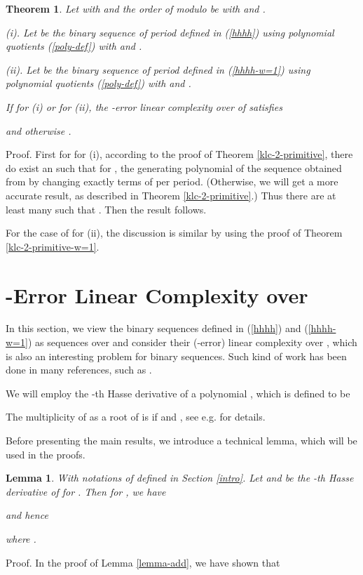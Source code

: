 \documentclass [11pt,a4paper]{article}
\newtheorem{theorem}{Theorem}
\newtheorem{lemma}{Lemma}
\begin{document}
\begin{theorem}\label{klc-2-general}
Let  with  and the order of  modulo  be  with  and .

(i). Let  be the binary sequence of period  defined in (\ref{hhhh}) using polynomial quotients (\ref{poly-def}) with  and .

(ii). Let  be the binary sequence of period  defined in (\ref{hhhh-w=1})  using polynomial quotients (\ref{poly-def}) with   and .

If  for (i) or  for (ii), the -error linear complexity over  of   satisfies

 and otherwise .
\end{theorem}
Proof. First for  for (i), according to the proof of Theorem \ref{klc-2-primitive}, there do exist an  such that
  for , the generating polynomial of the sequence obtained from  by changing exactly  terms of  per period. (Otherwise, we will get a more accurate result, as described in Theorem \ref{klc-2-primitive}.)
Thus there are at least  many  such that . Then the result follows.

For the case of   for (ii), the discussion is similar by using  the proof of Theorem \ref{klc-2-primitive-w=1}. ~\hfill 


\section{-Error Linear Complexity over }\label{LC-p}

In this section, we view the binary sequences  defined in  (\ref{hhhh}) and (\ref{hhhh-w=1}) as sequences over 
and consider their (-error) linear complexity over , which is also an interesting problem for binary sequences. Such kind of work has been done in many references, such as \cite{AM,AMW,AW06,AW,BW,CY,ESK,GLSW,HKN,HMMS}.

We will employ the -th Hasse derivative of a polynomial , which is defined to be

The multiplicity of  as a root of  is  if  and , see e.g. \cite[Ch 6.4]{LN} for details.

Before presenting the main results, we introduce a technical lemma, which will be used in the proofs.

\begin{lemma}\label{D-derivative}
With notations of  defined in Section \ref{intro}. Let 
and  be the -th Hasse derivative of  for . Then for , we have

and hence

where .
\end{lemma}
Proof. In the proof of Lemma \ref{lemma-add}, we have shown that
\end{document}
